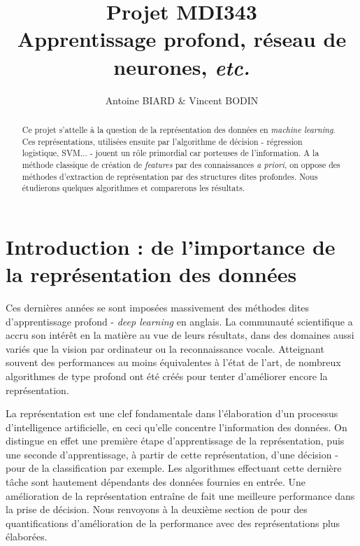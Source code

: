 \documentclass[10pt,a4paper]{article}
\title{Projet MDI343 \\
Apprentissage profond, réseau de neurones, \emph{etc.}}
\author{Antoine BIARD \& Vincent BODIN}
\date{}
\begin{document}
\maketitle

\hrulefill
\vspace{2cm}
\renewcommand{\abstractname}{Résumé}
\begin{abstract}
Ce projet s'attelle à la question de la représentation des données en \emph{machine learning}. Ces représentations, utilisées ensuite par l'algorithme de décision - régression logistique, SVM... - jouent un rôle primordial car porteuses de l'information. A la méthode classique de création de \emph{features} par des connaissances \emph{a priori}, on oppose des méthodes d'extraction de représentation par des structures dites profondes. Nous étudierons quelques algorithmes et comparerons les résultats.
\end{abstract}

\newpage
\tableofcontents
\newpage

\section{Introduction : de l'importance de la représentation des données}

Ces dernières années se sont imposées massivement des méthodes dites d'apprentissage profond - \emph{deep learning} en anglais. La communauté scientifique a accru son intérêt en la matière au vue de leurs résultats, dans des domaines aussi variés que la vision par ordinateur ou la reconnaissance vocale. Atteignant souvent des performances au moins équivalentes à l'état de l'art, de nombreux algorithmes de type profond ont été créés pour tenter d'améliorer encore la représentation.

La représentation est une clef fondamentale dans l'élaboration d'un processus d'intelligence artificielle, en ceci qu'elle concentre l'information des données. On distingue en effet une première étape d'apprentissage de la représentation, puis une seconde d'apprentissage, à partir de cette représentation, d'une décision - pour de la classification par exemple. Les algorithmes effectuant cette dernière tâche sont hautement dépendants des données fournies en entrée. Une amélioration de la représentation entraîne de fait une meilleure performance dans la prise de décision. Nous renvoyons à la deuxième section de \cite{DBLP:journals/corr/abs-1206-5538} pour des quantifications d'amélioration de la performance avec des représentations plus élaborées.
\end{document}
